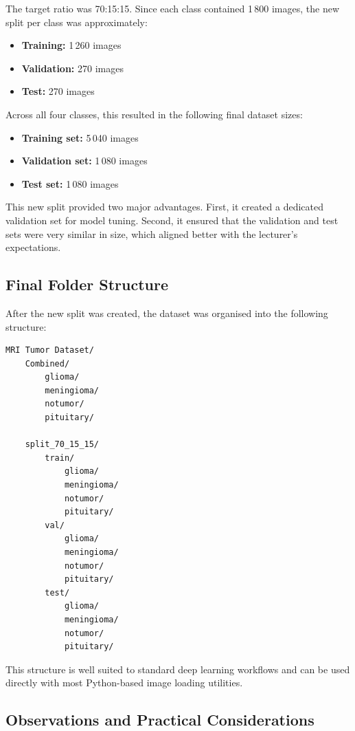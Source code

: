 \documentclass{article}
\begin{document}
The target ratio was 70:15:15. Since each class contained 1\,800 images, the new split per class was approximately:

\begin{itemize}
    \item \textbf{Training:} 1\,260 images
    \item \textbf{Validation:} 270 images
    \item \textbf{Test:} 270 images
\end{itemize}

Across all four classes, this resulted in the following final dataset sizes:

\begin{itemize}
    \item \textbf{Training set:} 5\,040 images
    \item \textbf{Validation set:} 1\,080 images
    \item \textbf{Test set:} 1\,080 images
\end{itemize}

This new split provided two major advantages. First, it created a dedicated validation set for model tuning. Second, it ensured that the validation and test sets were very similar in size, which aligned better with the lecturer's expectations.

\subsection{Final Folder Structure}

After the new split was created, the dataset was organised into the following structure:

\begin{verbatim}
MRI Tumor Dataset/
    Combined/
        glioma/
        meningioma/
        notumor/
        pituitary/

    split_70_15_15/
        train/
            glioma/
            meningioma/
            notumor/
            pituitary/
        val/
            glioma/
            meningioma/
            notumor/
            pituitary/
        test/
            glioma/
            meningioma/
            notumor/
            pituitary/
\end{verbatim}

This structure is well suited to standard deep learning workflows and can be used directly with most Python-based image loading utilities.

\subsection{Observations and Practical Considerations}
\end{document}
